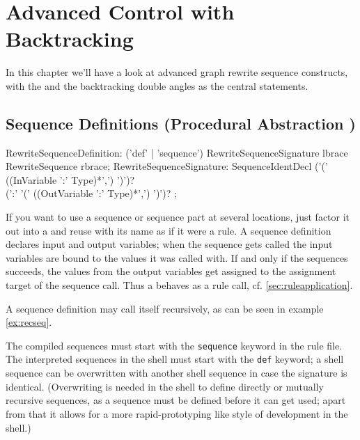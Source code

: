 \chapter{Advanced Control with Backtracking}\label{cha:transaction}

In this chapter we'll have a look at advanced graph rewrite sequence constructs,
with the  and the backtracking double angles as the central statements.


\section{Sequence Definitions (Procedural Abstraction )} \label{sec:sequencedefinition}
\begin{rail}
  RewriteSequenceDefinition: 
    ('def' | 'sequence') RewriteSequenceSignature lbrace RewriteSequence rbrace;
  RewriteSequenceSignature: 
    SequenceIdentDecl ('(' ((InVariable ':' Type)*',') ')')? \\ (':' '(' ((OutVariable ':' Type)*',') ')')?
	;
\end{rail}

If you want to use a sequence or sequence part at several locations, just factor it out into a  and reuse with its name as if it were a rule.
A sequence definition declares input and output variables; 
when the sequence gets called the input variables are bound to the values it was called with.
If and only if the sequences succeeds, the values from the output variables get assigned to the assignment target of the sequence call.
Thus a  behaves as a rule call, cf. \ref{sec:ruleapplication}.

A sequence definition may call itself recursively, as can be seen in example \ref{ex:recseq}.

The compiled sequences must start with the \texttt{sequence} keyword in the rule file.
The interpreted sequences in the shell must start with the \texttt{def} keyword; a shell sequence can be overwritten with another shell sequence in case the signature is identical.
(Overwriting is needed in the shell to define directly or mutually recursive sequences, as a sequence must be defined before it can get used; apart from that it allows for a more rapid-prototyping like style of development in the shell.)

